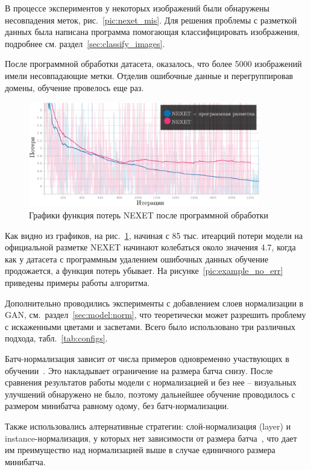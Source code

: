 \documentclass[11pt,a4paper]{extarticle}
\begin{document}
{			В процессе экспериментов у некоторых изображений были обнаружены несовпадения меток, рис.~\ref{pic:nexet_mis}. 
			Для решения проблемы с разметкой данных была написана программа помогающая классифицировать изображения, подробнее см. раздел~\ref{sec:classify_images}.

			После программной обработки датасета, оказалось, что более 5000 изображений имели несовпадающие метки.
			Отделив ошибочные данные и перегруппировав домены, обучение провелось еще раз.
			
			\begin{figure}[ht]
				\centering
				\includegraphics[width=0.9\textwidth]{img/loss_gen_no_err}
				\caption{Графики функция потерь NEXET после программной обработки}
				\label{pic:loss_gen_no_err}
			\end{figure}

			\noindent
			Как видно из графиков, на рис.~\ref{pic:loss_gen_no_err}, начиная с 85 тыс. итеарций потери модели на официальной разметке NEXET начинают колебаться около значения 4.7, когда как у датасета с программным удалением ошибочных данных обучение продожается, а функция потерь убывает. 
			На рисунке~\ref{pic:example_no_err} приведены примеры работы алгоритма.


			Дополнительно проводились эксперименты с добавлением слоев нормализации в GAN, см.~раздел~\ref{sec:model:norm}, что теоретически может разрешить проблему с искаженными цветами и засветами.
			Всего было использовано три различных подхода, табл.~\ref{tab:configs}.

			Батч-нормализация зависит от числа примеров одновременно участвующих в обучении~\cite{n_batch}. Это накладывает ограничение на размера батча снизу.
			После сравнения результатов работы модели с нормализацией и без нее -- визуальных улучшений обнаружено не было, поэтому дальнейшее обучение проводилось с размером минибатча равному одому, без батч-нормализации.

			Также использовались алтернативные стратегии: слой-нормализация (layer) и instance-нормализация, у которых нет зависимости от размера батча~\cite{n_layer,n_instance}, что дает им преимущество над нормализацией выше в случае единичного размера минибатча.
			
}
\end{document}
